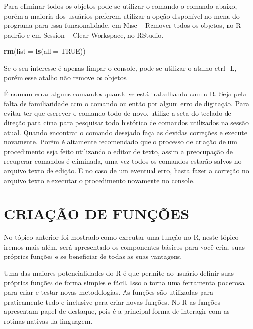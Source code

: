 \documentclass[
  11pt,
  a5paper,
  openany]{book}
\newenvironment{Shaded}{\begin{snugshade}}{\end{snugshade}}
\newcommand{\DataTypeTok}[1]{\textcolor[rgb]{0.13,0.29,0.53}{#1}}
\newcommand{\KeywordTok}[1]{\textcolor[rgb]{0.13,0.29,0.53}{\textbf{#1}}}
\newcommand{\NormalTok}[1]{#1}
\newcommand{\OtherTok}[1]{\textcolor[rgb]{0.56,0.35,0.01}{#1}}
\begin{document}
Para eliminar todos os objetos pode-se utilizar o comando o comando abaixo, porém a maioria dos usuários preferem utilizar a opção disponível no menu do programa para essa funcionalidade, em Misc -- Remover todos os objetos, no R padrão e em Session -- Clear Workspace, no RStudio.

\begin{Shaded}
\begin{Highlighting}[]
\KeywordTok{rm}\NormalTok{(}\DataTypeTok{list =} \KeywordTok{ls}\NormalTok{(}\DataTypeTok{all =} \OtherTok{TRUE}\NormalTok{))}
\end{Highlighting}
\end{Shaded}

Se o seu interesse é apenas limpar o console, pode-se utilizar o atalho ctrl+L, porém esse atalho não remove os objetos.

É comum errar alguns comandos quando se está trabalhando com o R. Seja pela falta de familiaridade com o comando ou então por algum erro de digitação. Para evitar ter que escrever o comando todo de novo, utilize a seta do teclado de direção para cima para pesquisar todo histórico de comandos utilizados na sessão atual. Quando encontrar o comando desejado faça as devidas correções e execute novamente. Porém é altamente recomendado que o processo de criação de um procedimento seja feito utilizando o editor de texto, assim a preocupação de recuperar comandos é eliminada, uma vez todos os comandos estarão salvos no arquivo texto de edição. E no caso de um eventual erro, basta fazer a correção no arquivo texto e executar o procedimento novamente no console.

\hypertarget{criauxe7uxe3o-de-funuxe7uxf5es}{%
\chapter{CRIAÇÃO DE FUNÇÕES}\label{criauxe7uxe3o-de-funuxe7uxf5es}}

No tópico anterior foi mostrado como executar uma função no R, neste tópico iremos mais além, será apresentado os componentes básicos para você criar suas próprias funções e se beneficiar de todas as suas vantagens.

Uma das maiores potencialidades do R é que permite ao usuário definir suas próprias funções de forma simples e fácil. Isso o torna uma ferramenta poderosa para criar e testar novas metodologias. As funções são utilizadas para praticamente tudo e inclusive para criar novas funções. No R as funções apresentam papel de destaque, pois é a principal forma de interagir com as rotinas nativas da linguagem.
\end{document}
